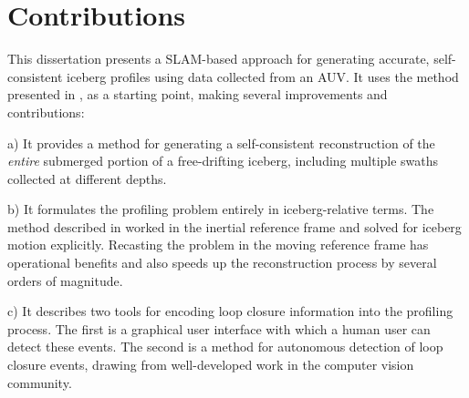 
\section{Contributions}

This dissertation presents a SLAM-based approach for generating accurate, self-consistent iceberg profiles using data collected from an AUV. It uses the method presented in \cite{Kimball2011b}, as a starting point, making several improvements and contributions: 

a) It provides a method for generating a self-consistent reconstruction of the \emph{entire} submerged portion of a free-drifting iceberg, including multiple swaths collected at different depths. 

b) It formulates the profiling problem entirely in iceberg-relative terms. The method described in \cite{Kimball2011b} worked in the inertial reference frame and solved for iceberg motion explicitly. Recasting the problem in the moving reference frame has operational benefits and also speeds up the reconstruction process by several orders of magnitude. 

c) It describes two tools for encoding loop closure information into the profiling process. The first is a graphical user interface with which a human user can detect these events. The second is a method for autonomous detection of loop closure events, drawing from well-developed work in the computer vision community.

